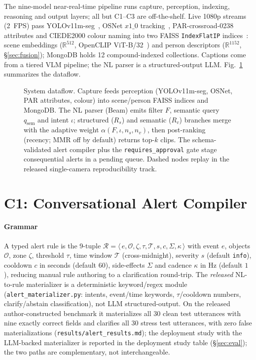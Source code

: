 ﻿\documentclass[conference]{IEEEtran}
\theoremstyle{plain}
\begin{document}
The nine-model near-real-time pipeline runs capture, perception, indexing, reasoning and output layers; all but C1--C3 are off-the-shelf. Live 1080p streams (2~FPS) pass YOLOv11m-seg~\cite{b14}, OSNet $x1\_0$ tracking~\cite{b22b}, PAR-crossroad-0238 attributes and CIEDE2000 colour naming into two FAISS \texttt{IndexFlatIP} indices~\cite{b25}: scene embeddings ($\mathbb{R}^{512}$, OpenCLIP ViT-B/32~\cite{b18b}) and person descriptors ($\mathbb{R}^{1152}$, \S\ref{sec:fusion}); MongoDB holds 12 compound-indexed collections. Captions come from a tiered VLM pipeline; the NL parser is a structured-output LLM. Fig.~\ref{fig:system} summarizes the dataflow.

\begin{figure}[!t]
\centering

\caption{System dataflow. Capture feeds perception (YOLOv11m-seg, OSNet, PAR
attributes, colour) into scene/person FAISS indices and MongoDB. The NL parser
(Beam) emits filter $F$, semantic query $q_{\mathrm{sem}}$ and intent $\iota$;
structured ($R_s$) and semantic ($R_v$) branches merge with the adaptive weight
$\alpha(F,\iota,n_s,n_v)$, then post-ranking (recency; MMR off by default)
returns top-$k$ clips. The schema-validated alert compiler plus the
\texttt{requires\_approval} gate stage consequential alerts in a pending queue.
Dashed nodes replay in the released single-camera reproducibility track.}
\label{fig:system}
\end{figure}

\section{C1: Conversational Alert Compiler}\label{sec:alert_grammar}

\paragraph*{Grammar}
A typed alert rule is the 9-tuple $\mathcal{R} = \langle\, e,\mathcal{O},\zeta,\tau,\mathcal{T},s,c,\Sigma,\kappa\,\rangle$ with event $e$, objects $\mathcal{O}$, zone $\zeta$, threshold $\tau$, time window $\mathcal{T}$ (cross-midnight), severity $s$ (default \texttt{info}), cooldown $c$ in seconds (default $60$), side-effects $\Sigma$ and cadence $\kappa$ in Hz (default $1$), reducing manual rule authoring to a clarification round-trip. The \emph{released} NL-to-rule materializer is a deterministic keyword/regex module (\texttt{alert\_\allowbreak materializer.py}: intents, event/time keywords, $\tau$/cooldown numbers, clarify/abstain classification), not LLM structured-output. On the released author-constructed benchmark it materializes all 30 clean test utterances with nine exactly correct fields and clarifies all 30 stress test utterances, with zero false materializations (\texttt{results/alert\_results.md}); the deployment study with the LLM-backed materializer is reported in the deployment study table (\S\ref{sec:eval}); the two paths are complementary, not interchangeable.
\end{document}
